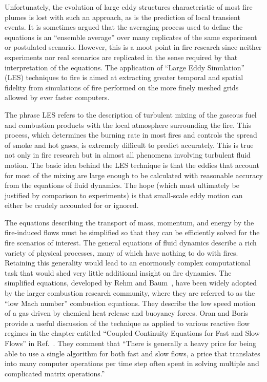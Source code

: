 \documentclass[11pt]{book}
\begin{document}
Unfortunately, the evolution of large eddy structures characteristic of most fire plumes is lost
with such an approach, as is the prediction of local transient events. It is sometimes
argued that the averaging process used to define the equations is an ``ensemble average'' over many
replicates of the same experiment or postulated scenario. However, this is a moot point in
fire research since neither experiments nor real scenarios are replicated in the sense required
by that interpretation of the equations. The application of ``Large Eddy Simulation'' (LES)
techniques to fire is aimed at extracting greater temporal and spatial fidelity from simulations
of fire performed on the more finely meshed grids allowed by ever faster computers.

The phrase LES refers to the description of turbulent mixing of the gaseous fuel and combustion
products with the local atmosphere surrounding the fire. This process, which determines the burning
rate in most fires and controls the spread of smoke and hot gases, is extremely difficult
to predict accurately. This is true not only in fire research but in almost all phenomena
involving turbulent fluid motion. The basic idea behind the LES technique is that the eddies
that account for most of the mixing are large enough to be calculated with reasonable
accuracy from the equations of fluid dynamics. The hope (which must ultimately be justified
by comparison to experiments) is that small-scale eddy motion can either be crudely accounted for or ignored.

The equations describing the transport of mass, momentum, and energy by the fire-induced flows must
be simplified so that they can be efficiently solved for the fire scenarios of interest.
The general equations of fluid dynamics describe a rich variety of physical processes,
many of which have nothing to do with fires. Retaining this generality would lead to an
enormously complex computational task that would shed very little additional insight on fire dynamics.
The simplified equations, developed by Rehm and Baum~\cite{Rehm:1}, have been widely adopted
by the larger combustion research community, where they are referred to as the ``low Mach number''
combustion equations. They describe the low speed motion of a gas driven by chemical heat release and buoyancy forces.
Oran and Boris provide a useful discussion of the technique as applied to various reactive flow regimes in the chapter
entitled ``Coupled Continuity Equations for Fast and Slow Flows'' in Ref.~\cite{Oran:1}.
They comment that ``There is generally a heavy price for being able to use a single algorithm for both
fast and slow flows, a price that translates into many computer operations per time step often spent in
solving multiple and complicated matrix operations.''
\end{document}
